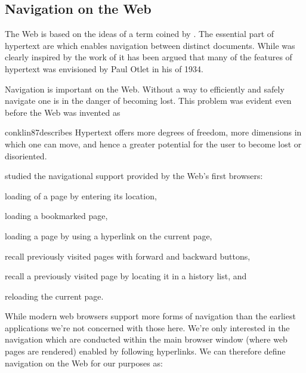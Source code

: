 \subsection{Navigation on the Web}
\label{section:social.navigation.navigation.navigation.on.the.web}

The Web is based on the ideas of \dash{}a term coined by
\citet[]{nelson65}. The essential part of hypertext are
 \citep[]{nelson65} which enables navigation between
distinct documents. While \citeauthor{nelson65} was clearly
inspired by the work of \citet{bush45} it has been argued \citep{rayward94}
that many of the features of hypertext was envisioned by Paul Otlet in his
 of 1934.

Navigation is important on the Web. Without a way to efficiently and safely
navigate one is in the danger of becoming lost. This problem was evident even
before the Web was invented as
\begin{fullquote}[\p{38}]{conklin87}{describes}
  Hypertext offers more degrees of freedom, more dimensions in which one
  can move, and hence a greater potential for the user
  to become lost or disoriented.
\end{fullquote}

\citet{jones96} studied the navigational support provided by the Web's first
browsers:
\begin{inparaenum}[(i)]
  \item loading of a page by entering its location,
  \item loading a bookmarked page,
  \item loading a page by using a hyperlink on the current page,
  \item recall previously visited pages with forward and backward buttons,
  \item recall a previously visited page by locating it in a history list, and
  \item reloading the current page.
\end{inparaenum}
While modern web browsers support more forms of navigation%
than the earliest applications we're not concerned with those here.
We're only interested in the navigation which are conducted within the main
browser window (where web pages are rendered) enabled by following hyperlinks.
We can therefore define navigation on the Web for our purposes as:

